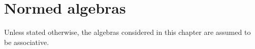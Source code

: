 \chapter{Normed algebras}

Unless stated otherwise, the algebras considered in this chapter are assumed to be associative.

